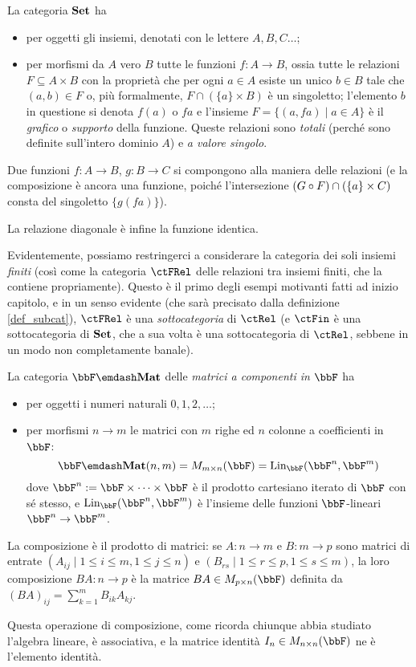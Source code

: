 \begin{example}\label{ex_cat_insiemi}
	La categoria \(\mathbf{Set}\) ha
	\begin{itemize}
		\item per oggetti gli insiemi, denotati con le lettere \(A,B,C\dots\);
		\item per morfismi da \(A\) vero \(B\) tutte le funzioni \(f : A\to B\), ossia tutte le relazioni \(F\subseteq A\times B\) con la proprietà che per ogni \(a\in A\) esiste un unico \(b\in B\) tale che \((a,b)\in F\) o, più formalmente, \(F\cap(\{a\}\times B)\) è un singoletto; l'elemento \(b\) in questione si denota \(f(a)\) o \(fa\) e l'insieme \(F = \{(a,fa)\mid a\in A\}\) è il \emph{grafico} o \emph{supporto} della funzione. Queste relazioni sono \emph{totali} (perché sono definite sull'intero dominio \(A\)) e \emph{a valore singolo}.
	\end{itemize}
	Due funzioni \(f : A\to B\), \(g : B\to C\) si compongono alla maniera delle relazioni (e la composizione è ancora una funzione, poiché l'intersezione \((G\circ F)\cap (\{a\}\times C)\) consta del singoletto \(\{g(fa)\}\)).

	La relazione diagonale è infine la funzione identica.
\end{example}
Evidentemente, possiamo restringerci a considerare la categoria dei soli insiemi \emph{finiti} (così come la categoria \(\ctFRel\) delle relazioni tra insiemi finiti, che la contiene propriamente). Questo è il primo degli esempi motivanti fatti ad inizio capitolo, e in un senso evidente (che sarà precisato dalla definizione \ref{def_subcat}), \(\ctFRel\) è una \emph{sottocategoria} di \(\ctRel\) (e \(\ctFin\) è una sottocategoria di \(\mathbf{Set}\), che a sua volta è una sottocategoria di \(\ctRel\), sebbene in un modo non completamente banale).
\begin{example}\label{ex_cat_matrici}
	La categoria \(\bbF\emdash\cate{Mat}\) delle \emph{matrici a componenti in \(\bbF\)} ha
	\begin{itemize}
		\item per oggetti i numeri naturali \(0,1,2,\dots\);
		\item per morfismi \(n\to m\) le matrici con \(m\) righe ed \(n\) colonne a coefficienti in \(\bbF\):
		      \[\bbF\emdash\cate{Mat}(n,m) = M_{m\times n}(\bbF) = \text{Lin}_{\bbF}(\bbF^n,\bbF^m)\]
		      dove \(\bbF^n:=\bbF \times\dots\times\bbF\) è il prodotto cartesiano iterato di \(\bbF\) con sé stesso, e \(\text{Lin}_{\bbF}(\bbF^n,\bbF^m)\) è l'insieme delle funzioni \(\bbF\)-lineari \(\bbF^n\to\bbF^m\).
	\end{itemize}
	La composizione è il prodotto di matrici: se \(A : n\to m\) e \(B : m\to p\) sono matrici di entrate \((A_{ij}\mid 1\le i\le m,1\le j\le n)\) e \((B_{rs}\mid 1\le r\le p,1\le s\le m)\), la loro composizione \(BA : n\to p\) è la matrice \(BA\in M_{p\times n}(\bbF)\) definita da \((BA)_{ij} = \sum_{k=1}^m B_{ik}A_{kj}\).

	Questa operazione di composizione, come ricorda chiunque abbia studiato l'algebra lineare, è associativa, e la matrice identità \(I_n\in M_{n\times n}(\bbF)\) ne è l'elemento identità.
\end{example}
